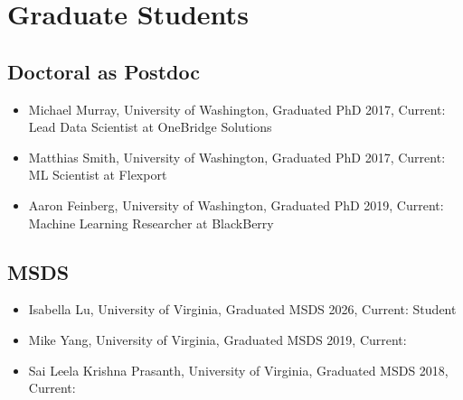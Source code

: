 \documentclass[10pt]{article}
\begin{document}
\section*{Graduate Students} %
\subsection*{Doctoral as Postdoc}
\begin{itemize}
\item Michael Murray, University of Washington, Graduated PhD 2017, Current: Lead Data Scientist at OneBridge Solutions
\item Matthias Smith, University of Washington, Graduated PhD 2017, Current: ML Scientist at Flexport
\item Aaron Feinberg, University of Washington, Graduated PhD 2019, Current: Machine Learning Researcher at BlackBerry
\end{itemize}

\subsection*{MSDS}
\begin{itemize}
\item Isabella Lu, University of Virginia, Graduated MSDS 2026, Current: Student
\item Mike Yang, University of Virginia, Graduated MSDS 2019, Current:
\item Sai Leela Krishna Prasanth, University of Virginia, Graduated MSDS 2018, Current:
\end{itemize}
\end{document}
